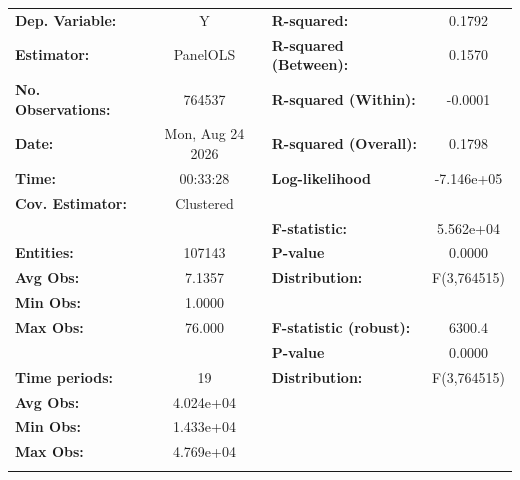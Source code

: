 \begin{center}
\begin{tabular}{lclc}
\toprule
\textbf{Dep. Variable:}         &         Y          & \textbf{  R-squared:         }   &      0.1792      \\
\textbf{Estimator:}             &      PanelOLS      & \textbf{  R-squared (Between):}  &      0.1570      \\
\textbf{No. Observations:}      &       764537       & \textbf{  R-squared (Within):}   &     -0.0001      \\
\textbf{Date:}                  &  Mon, Aug 24 2026  & \textbf{  R-squared (Overall):}  &      0.1798      \\
\textbf{Time:}                  &      00:33:28      & \textbf{  Log-likelihood     }   &    -7.146e+05    \\
\textbf{Cov. Estimator:}        &     Clustered      & \textbf{                     }   &                  \\
\textbf{}                       &                    & \textbf{  F-statistic:       }   &    5.562e+04     \\
\textbf{Entities:}              &       107143       & \textbf{  P-value            }   &      0.0000      \\
\textbf{Avg Obs:}               &       7.1357       & \textbf{  Distribution:      }   &   F(3,764515)    \\
\textbf{Min Obs:}               &       1.0000       & \textbf{                     }   &                  \\
\textbf{Max Obs:}               &       76.000       & \textbf{  F-statistic (robust):} &      6300.4      \\
\textbf{}                       &                    & \textbf{  P-value            }   &      0.0000      \\
\textbf{Time periods:}          &         19         & \textbf{  Distribution:      }   &   F(3,764515)    \\
\textbf{Avg Obs:}               &     4.024e+04      & \textbf{                     }   &                  \\
\textbf{Min Obs:}               &     1.433e+04      & \textbf{                     }   &                  \\
\textbf{Max Obs:}               &     4.769e+04      & \textbf{                     }   &                  \\
\textbf{}                       &                    & \textbf{                     }   &                  \\

\end{tabular}
\end{center}
